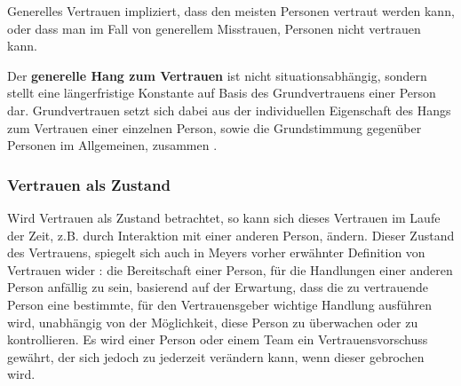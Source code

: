 \documentclass[a4paper,11pt]{article}%
\renewcommand{\\}{\vspace*{0.5\baselineskip} \newline}
\begin{document}
Generelles Vertrauen impliziert, dass den meisten Personen vertraut werden kann, oder dass man im Fall von generellem Misstrauen, Personen nicht vertrauen kann. \citep[p.409]{stolle2002trusting}

Der \textbf{generelle Hang zum Vertrauen} ist nicht situationsabhängig, sondern stellt eine längerfristige Konstante auf Basis des Grundvertrauens einer Person dar. Grundvertrauen setzt sich dabei aus der individuellen Eigenschaft des Hangs zum Vertrauen einer einzelnen Person, sowie die Grundstimmung gegenüber Personen im Allgemeinen, zusammen \citep[p.11]{couch1996assessment}.

	\subsubsection{Vertrauen als Zustand}
\label{Vertrauen als Zustand}
Wird Vertrauen als \dq{}Zustand\dq{} betrachtet, so kann sich dieses Vertrauen im Laufe der Zeit, z.B. durch Interaktion mit einer anderen Person, ändern. Dieser \dq Zustand\dq{} des Vertrauens, spiegelt sich auch in Meyers \citep[p.712]{mayer1995integrative} vorher erwähnter Definition von Vertrauen wider :\\ \dq die Bereitschaft einer Person, für die Handlungen einer anderen Person anfällig zu sein, basierend auf der Erwartung, dass die zu vertrauende Person eine bestimmte, für den Vertrauensgeber wichtige Handlung ausführen wird, unabhängig von der Möglichkeit, diese Person zu überwachen oder zu kontrollieren.\dq{} \\
Es wird einer Person oder einem Team ein Vertrauensvorschuss gewährt, der sich jedoch zu jederzeit verändern kann, wenn dieser gebrochen wird.

\end{document}
